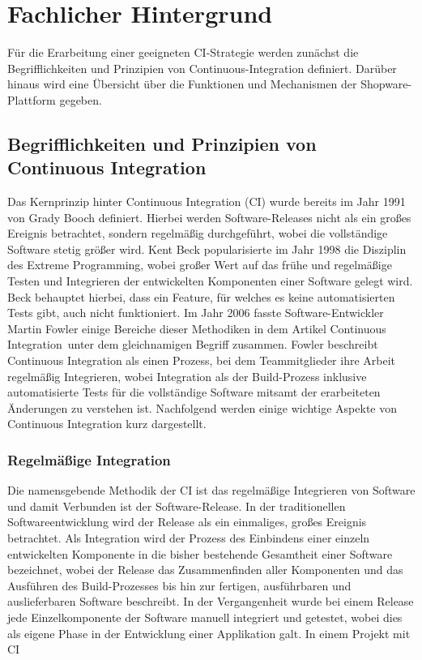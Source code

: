 
\section{Fachlicher Hintergrund} \label{sec:02-background}

Für die Erarbeitung einer geeigneten CI-Strategie werden zunächst die Begrifflichkeiten und Prinzipien von
Continuous-Integration definiert.
Darüber hinaus wird eine Übersicht über die Funktionen und Mechanismen der Shopware-Plattform gegeben.

\subsection{Begrifflichkeiten und Prinzipien von Continuous Integration} \label{subsec:02-background-1}

Das Kernprinzip hinter Continuous Integration (CI) wurde bereits im Jahr 1991 von Grady Booch definiert.
Hierbei werden Software-Releases nicht als ein großes Ereignis betrachtet, sondern regelmäßig durchgeführt, wobei
die vollständige Software stetig größer wird.
Kent Beck popularisierte im Jahr 1998 die Disziplin des \glqq Extreme Programming\grqq, wobei großer Wert auf das frühe
und regelmäßige Testen und Integrieren der entwickelten Komponenten einer Software gelegt wird.
Beck behauptet hierbei, dass ein Feature, für welches es keine automatisierten Tests gibt, auch nicht funktioniert.
Im Jahr 2006 fasste Software-Entwickler Martin Fowler einige Bereiche dieser Methodiken in dem Artikel
\glqq Continuous Integration\grqq\ unter dem gleichnamigen Begriff zusammen.
Fowler beschreibt Continuous Integration als einen Prozess, bei dem Teammitglieder ihre Arbeit regelmäßig Integrieren,
wobei Integration als der Build-Prozess inklusive automatisierte Tests für die vollständige Software mitsamt der
erarbeiteten Änderungen zu verstehen ist.
Nachfolgend werden einige wichtige Aspekte von Continuous Integration kurz dargestellt.

\subsubsection{Regelmäßige Integration}

Die namensgebende Methodik der CI ist das regelmäßige Integrieren von Software und damit Verbunden ist der
Software-Release.
In der traditionellen Softwareentwicklung wird der Release als ein einmaliges, großes Ereignis betrachtet.
Als Integration wird der Prozess des Einbindens einer einzeln entwickelten Komponente in die bisher bestehende
Gesamtheit einer Software bezeichnet, wobei der Release das Zusammenfinden aller Komponenten und das Ausführen des
Build-Prozesses bis hin zur fertigen, ausführbaren und auslieferbaren Software beschreibt.
In der Vergangenheit wurde bei einem Release jede Einzelkomponente der Software manuell integriert und getestet, wobei
dies als eigene Phase in der Entwicklung einer Applikation galt.
In einem Projekt mit CI

